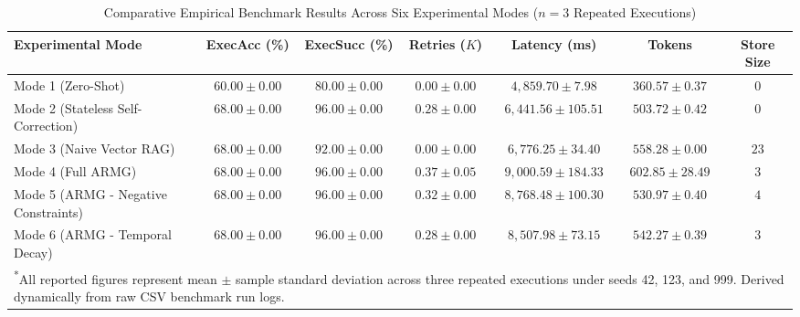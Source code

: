 \begin{table}[t]
\centering
\caption{Comparative Empirical Benchmark Results Across Six Experimental Modes ($n = 3$ Repeated Executions)}
\label{tab:results}
\begin{tabular}{lcccccc}
\hline
\textbf{Experimental Mode} & \textbf{ExecAcc (\%)} & \textbf{ExecSucc (\%)} & \textbf{Retries ($K$)} & \textbf{Latency (ms)} & \textbf{Tokens} & \textbf{Store Size} \\
\hline
Mode 1 (Zero-Shot) & $60.00 \pm 0.00$ & $80.00 \pm 0.00$ & $0.00 \pm 0.00$ & $4,859.70 \pm 7.98$ & $360.57 \pm 0.37$ & $0$ \\
Mode 2 (Stateless Self-Correction) & $68.00 \pm 0.00$ & $96.00 \pm 0.00$ & $0.28 \pm 0.00$ & $6,441.56 \pm 105.51$ & $503.72 \pm 0.42$ & $0$ \\
Mode 3 (Naive Vector RAG) & $68.00 \pm 0.00$ & $92.00 \pm 0.00$ & $0.00 \pm 0.00$ & $6,776.25 \pm 34.40$ & $558.28 \pm 0.00$ & $23$ \\
Mode 4 (Full ARMG) & $68.00 \pm 0.00$ & $96.00 \pm 0.00$ & $0.37 \pm 0.05$ & $9,000.59 \pm 184.33$ & $602.85 \pm 28.49$ & $3$ \\
Mode 5 (ARMG - Negative Constraints) & $68.00 \pm 0.00$ & $96.00 \pm 0.00$ & $0.32 \pm 0.00$ & $8,768.48 \pm 100.30$ & $530.97 \pm 0.40$ & $4$ \\
Mode 6 (ARMG - Temporal Decay) & $68.00 \pm 0.00$ & $96.00 \pm 0.00$ & $0.28 \pm 0.00$ & $8,507.98 \pm 73.15$ & $542.27 \pm 0.39$ & $3$ \\
\hline
\multicolumn{7}{l}{\footnotesize \textsuperscript{*}All reported figures represent mean $\pm$ sample standard deviation across three repeated executions under seeds 42, 123, and 999. Derived dynamically from raw CSV benchmark run logs.} \\
\end{tabular}
\end{table}
